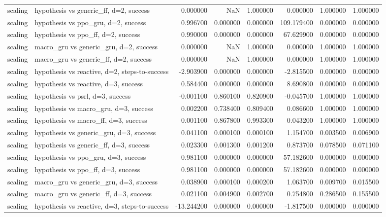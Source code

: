 \begin{tabular}{llrrrrrr}
scaling & hypothesis vs generic\_ff, d=2, success & 0.000000 & NaN & 1.000000 & 0.000000 & 1.000000 & 1.000000 \\
scaling & hypothesis vs ppo\_gru, d=2, success & 0.996700 & 0.000000 & 0.000000 & 109.179400 & 0.000000 & 0.000000 \\
scaling & hypothesis vs ppo\_ff, d=2, success & 0.990000 & 0.000000 & 0.000000 & 67.629900 & 0.000000 & 0.000000 \\
scaling & macro\_gru vs generic\_gru, d=2, success & 0.000000 & NaN & 1.000000 & 0.000000 & 1.000000 & 1.000000 \\
scaling & macro\_gru vs generic\_ff, d=2, success & 0.000000 & NaN & 1.000000 & 0.000000 & 1.000000 & 1.000000 \\
scaling & hypothesis vs reactive, d=2, steps-to-success & -2.903900 & 0.000000 & 0.000000 & -2.815500 & 0.000000 & 0.000000 \\
scaling & hypothesis vs reactive, d=3, success & 0.584400 & 0.000000 & 0.000000 & 8.690800 & 0.000000 & 0.000000 \\
scaling & hypothesis vs psrl, d=3, success & -0.001100 & 0.860100 & 0.820900 & -0.045700 & 1.000000 & 1.000000 \\
scaling & hypothesis vs macro\_gru, d=3, success & 0.002200 & 0.738400 & 0.809400 & 0.086600 & 1.000000 & 1.000000 \\
scaling & hypothesis vs macro\_ff, d=3, success & 0.001100 & 0.867800 & 0.993300 & 0.043200 & 1.000000 & 1.000000 \\
scaling & hypothesis vs generic\_gru, d=3, success & 0.041100 & 0.000100 & 0.000100 & 1.154700 & 0.003500 & 0.006900 \\
scaling & hypothesis vs generic\_ff, d=3, success & 0.023300 & 0.001300 & 0.001200 & 0.873700 & 0.078500 & 0.071100 \\
scaling & hypothesis vs ppo\_gru, d=3, success & 0.981100 & 0.000000 & 0.000000 & 57.182600 & 0.000000 & 0.000000 \\
scaling & hypothesis vs ppo\_ff, d=3, success & 0.981100 & 0.000000 & 0.000000 & 57.182600 & 0.000000 & 0.000000 \\
scaling & macro\_gru vs generic\_gru, d=3, success & 0.038900 & 0.000100 & 0.000200 & 1.063700 & 0.009700 & 0.015500 \\
scaling & macro\_gru vs generic\_ff, d=3, success & 0.021100 & 0.004900 & 0.002700 & 0.754800 & 0.286500 & 0.155500 \\
scaling & hypothesis vs reactive, d=3, steps-to-success & -13.244200 & 0.000000 & 0.000000 & -1.817500 & 0.000000 & 0.000000 \\

\end{tabular}

